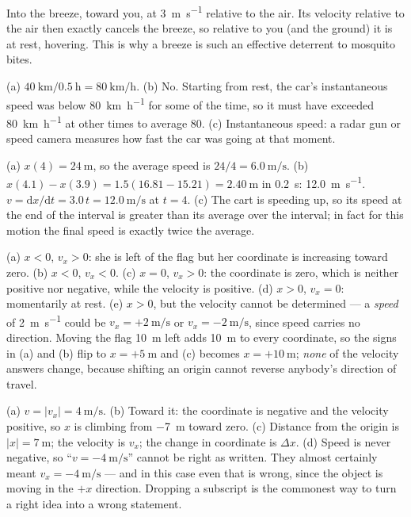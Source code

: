 \documentclass[11pt,twoside,openany]{book}
\newcommand{\dd}{\mathrm{d}}
\newcommand{\viewtag}[3]{\fcolorbox{#2}{#3}{\footnotesize\textbf{\textcolor{#2}{#1}}}}
\newcommand{\elemtag}{\viewtag{Elementary}{elemcol}{elempale}}
\newcommand{\calctag}{\viewtag{Calculus}{calccol}{calcpale}}
\begin{document}
\begin{description}[leftmargin=2em,itemsep=2pt]
  \item[1.6] Into the breeze, toward you, at \SI{3}{\metre\per\second} relative to the air. Its velocity relative to the air then exactly cancels the breeze, so relative to you (and the ground) it is at rest, hovering. This is why a breeze is such an effective deterrent to mosquito bites.
  \item[1.7] (a) $\SI{40}{\kilo\metre}/\SI{0.5}{\hour} = \SI{80}{\kilo\metre\per\hour}$. (b) No. Starting from rest, the car's instantaneous speed was below \SI{80}{\kilo\metre\per\hour} for some of the time, so it must have exceeded \SI{80}{\kilo\metre\per\hour} at other times to average \num{80}. (c) Instantaneous speed: a radar gun or speed camera measures how fast the car was going at that moment.
  \item[1.8] (a) $x(4) = \SI{24}{\metre}$, so the average speed is $24/4 = \SI{6.0}{\metre\per\second}$. (b) \elemtag\ $x(4.1) - x(3.9) = 1.5(16.81 - 15.21) = \SI{2.40}{\metre}$ in \SI{0.2}{\second}: \SI{12.0}{\metre\per\second}. \calctag\ $v = \dd x/\dd t = 3.0\,t = \SI{12.0}{\metre\per\second}$ at $t = 4$. (c) The cart is speeding up, so its speed at the end of the interval is greater than its average over the interval; in fact for this motion the final speed is exactly twice the average.
  \item[1.9] (a) $x < 0$, $v_x > 0$: she is left of the flag but her coordinate is increasing toward zero. (b) $x < 0$, $v_x < 0$. (c) $x = 0$, $v_x > 0$: the coordinate is zero, which is neither positive nor negative, while the velocity is positive. (d) $x > 0$, $v_x = 0$: momentarily at rest. (e) $x > 0$, but the velocity cannot be determined --- a \emph{speed} of \SI{2}{\metre\per\second} could be $v_x = +\SI{2}{\metre\per\second}$ or $v_x = \SI{-2}{\metre\per\second}$, since speed carries no direction. Moving the flag \SI{10}{\metre} left adds \SI{10}{\metre} to every coordinate, so the signs in (a) and (b) flip to $x = +\SI{5}{\metre}$ and (c) becomes $x = +\SI{10}{\metre}$; \emph{none} of the velocity answers change, because shifting an origin cannot reverse anybody's direction of travel.
  \item[1.10] (a) $v = |v_x| = \SI{4}{\metre\per\second}$. (b) Toward it: the coordinate is negative and the velocity positive, so $x$ is climbing from \SI{-7}{\metre} toward zero. (c) Distance from the origin is $|x| = \SI{7}{\metre}$; the velocity is $v_x$; the change in coordinate is $\Delta x$. (d) Speed is never negative, so ``$v = \SI{-4}{\metre\per\second}$'' cannot be right as written. They almost certainly meant $v_x = \SI{-4}{\metre\per\second}$ --- and in this case even that is wrong, since the object is moving in the $+x$ direction. Dropping a subscript is the commonest way to turn a right idea into a wrong statement.

\end{description}
\end{document}
